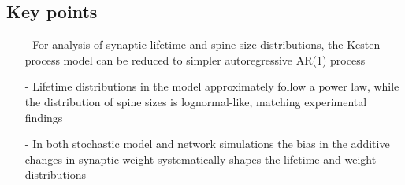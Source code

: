 \documentclass[a0,portrait]{a0poster}
\begin{document}
\begin{multicols}{3} %
  
  
  
  
                          

\vspace{1.5cm}

\begin{minipage}{\columnwidth}

  \section{Key points}

\begin{itemize}
\item[-] For analysis of synaptic lifetime and spine size distributions, the Kesten process model can be reduced to simpler autoregressive AR(1) process
\item[-] Lifetime distributions in the model approximately follow a power law, while the distribution of spine sizes is lognormal-like, matching experimental findings
\item[-] In both stochastic model and network simulations the bias in the additive changes in synaptic weight systematically shapes the lifetime and weight distributions
\end{itemize}

  \printbibliography
  \vspace{-1.5cm}
\end{minipage}
\end{multicols}



\end{document}
